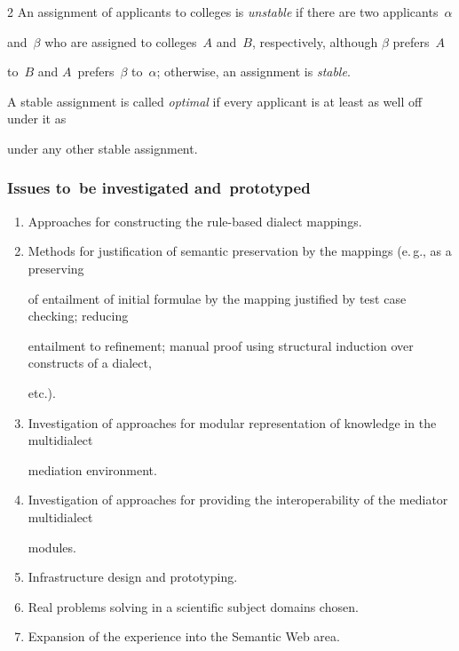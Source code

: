 \begin{multicols}{2}
An assignment of applicants to colleges is \textit{unstable} if there are two applicants~$\alpha$ 

and~$\beta$ who are assigned to colleges~$A$ and~$B$, respectively, although $\beta$ prefers~$A$ 

to~$B$ and $A$~prefers~$\beta$ to~$\alpha$; otherwise, an assignment is \textit{stable}.



A stable assignment is called \textit{optimal} if every applicant is at least as well off under it as 

under any other stable assignment. 



\subsubsection{Issues to~be investigated and~prototyped}



\noindent

\begin{enumerate}[1.]

\item Approaches for constructing the rule-based dialect mappings.

\item Methods for justification of semantic preservation by the mappings (e.\,g., as a preserving 

of entailment of initial formulae by the mapping justified by test case checking; reducing 

entailment to refinement; manual proof using structural induction over constructs of a dialect, 

etc.).

\item Investigation of approaches for modular representation of knowledge in the multidialect 

mediation environment.

\item Investigation of approaches for providing the interoperability of the mediator multidialect 

modules.

\item Infrastructure design and prototyping.

\item Real problems solving in a scientific subject domains chosen.

\item Expansion of the experience into the Semantic Web area.


\end{enumerate}
\end{multicols}
